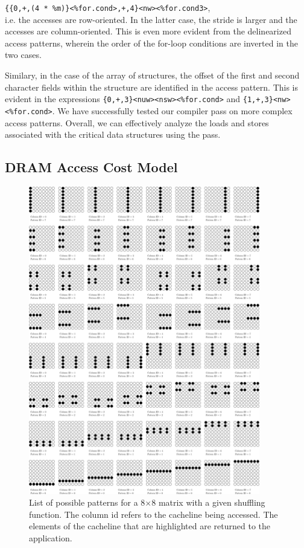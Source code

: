\documentclass[letterpaper]{article}
\begin{document}
\texttt{\{\{0,+,(4 * \%m)\}<\%for.cond>,+,4\}<nw><\%for.cond3>},\\

i.e. the accesses are row-oriented. In the latter case, the stride is larger and
the accesses are column-oriented. This is even more evident from the delinearized access
patterns, wherein the order of the for-loop conditions are inverted in the
two cases.

Similary, in the case of the array of structures, the offset of the first
and second character fields within the structure are identified in the access
pattern.
This is evident in the expressions \texttt{\{0,+,3\}<nuw><nsw><\%for.cond>} and
\texttt{\{1,+,3\}<nw><\%for.cond>}. 
We have successfully tested our compiler pass on more complex access patterns. 
Overall, we can effectively analyze the loads and stores associated with the
critical data structures using the pass.

\subsection{DRAM Access Cost Model}

\begin{figure}[ht!]
	\centering
	\includegraphics[width=0.9\textwidth]{images/pattern}
	\caption{List of possible patterns for a 8$\times$8 matrix with a given
	shuffling function. The column id refers to the cacheline being accessed. 
	The elements of the cacheline that are highlighted are returned to the
	application.}
	\label{fig:pattern}
\end{figure}
\end{document}
